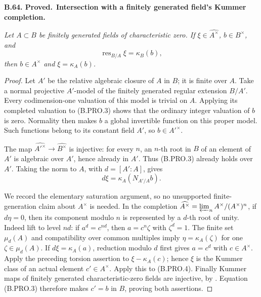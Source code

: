 \documentclass[11pt,a4paper]{article}
\newenvironment{claim}[3]{\par\medskip\noindent\hypertarget{#1}{\textbf{#1. #2.}}\ \textbf{#3.}\par\nopagebreak\smallskip\begingroup\itshape}{\endgroup\par\smallskip}
\begin{document}
\begin{claim}{B.64}{Proved}{Intersection with a finitely generated field's Kummer completion}
Let \(A\subset B\) be finitely generated fields of characteristic
zero. If \(\xi\in\widehat{A^\times}\), \(b\in B^\times\), and
\[
                    \operatorname{res}_{B/A}\xi=\kappa_B(b),
                                                               \tag{B.PRO.3}
\]
then \(b\in A^\times\) and \(\xi=\kappa_A(b)\).
\end{claim}
\begin{proof}
Let \(A'\) be the relative algebraic closure of \(A\) in
\(B\); it is finite over \(A\). Take a normal projective
\(A'\)-model of the finitely generated regular extension
\(B/A'\). Every codimension-one valuation of this model is
trivial on \(A\). Applying its completed valuation to
(B.PRO.3) shows that the ordinary integer valuation of \(b\)
is zero. Normality then makes \(b\) a global invertible function
on this proper model. Such functions belong to its constant
field \(A'\), so \(b\in A'^\times\).

The map \(\widehat{A'^\times}\to\widehat{B^\times}\) is
injective: for every \(n\), an \(n\)-th root in \(B\) of an
element of \(A'\) is algebraic over \(A'\), hence already in
\(A'\). Thus (B.PRO.3) already holds over \(A'\). Taking the
norm to \(A\), with \(d=[A':A]\), gives
\[
                       d\xi=\kappa_A(N_{A'/A}b).          \tag{B.PRO.4}
\]

We record the elementary saturation argument, so no unsupported
finite-generation claim about \(A^\times\) is needed. In the
completion \(\widehat{A^\times}=\varprojlim_n
A^\times/(A^\times)^n\), if \(d\eta=0\), then its component
modulo \(n\) is represented by a \(d\)-th root of unity.
Indeed lift to level \(nd\): if \(a^d=c^{nd}\), then
\(a=c^n\zeta\) with \(\zeta^d=1\). The finite set
\(\mu_d(A)\) and compatibility over common multiples imply
\(\eta=\kappa_A(\zeta)\) for one \(\zeta\in\mu_d(A)\).
If \(d\xi=\kappa_A(a)\), reduction modulo \(d\) first gives
\(a=c^d\) with \(c\in A^\times\). Apply the preceding
torsion assertion to \(\xi-\kappa_A(c)\); hence \(\xi\)
is the Kummer class of an actual element \(c'\in A^\times\).
Apply this to (B.PRO.4). Finally Kummer maps of finitely generated
characteristic-zero fields are injective, by
\citep[Proposition~5.24 and Observation~6.9]{CarlsonHaineWolf2024}.
Equation (B.PRO.3) therefore makes \(c'=b\) in \(B\), proving
both assertions.
\end{proof}
\end{document}
